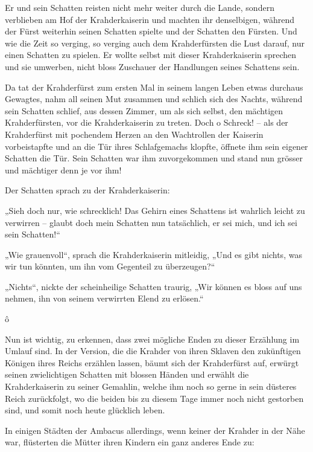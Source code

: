 \documentclass[10pt, a4paper, oneside]{book}
\newcommand{\trennzeichen}{%
        \begin{center}%
            \vspace*{-1em}
            \andorfont\Huge{ô}
        \end{center}
    }
\begin{document}
Er und sein Schatten reisten nicht mehr weiter durch die Lande, sondern verblieben am Hof der Krahderkaiserin und machten ihr denselbigen, während der Fürst weiterhin seinen Schatten spielte und der Schatten den Fürsten. Und wie die Zeit so verging, so verging auch dem Krahderfürsten die Lust darauf, nur einen Schatten zu spielen. Er wollte selbst mit dieser Krahderkaiserin sprechen und sie umwerben, nicht bloss Zuschauer der Handlungen seines Schattens sein.

Da tat der Krahderfürst zum ersten Mal in seinem langen Leben etwas durchaus Gewagtes, nahm all seinen Mut zusammen und schlich sich des Nachts, während sein Schatten schlief, aus dessen Zimmer, um als sich selbst, den mächtigen Krahderfürsten, vor die Krahderkaiserin zu treten. Doch o Schreck! – als der Krahderfürst mit pochendem Herzen an den Wachtrollen der Kaiserin vorbeistapfte und an die Tür ihres Schlafgemachs klopfte, öffnete ihm sein eigener Schatten die Tür. Sein Schatten war ihm zuvorgekommen und stand nun grösser und mächtiger denn je vor ihm!

Der Schatten sprach zu der Krahderkaiserin:

„Sieh doch nur, wie schrecklich! Das Gehirn eines Schattens ist wahrlich leicht zu verwirren – glaubt doch mein Schatten nun tatsächlich, er sei mich, und ich sei sein Schatten!“

„Wie grauenvoll“, sprach die Krahderkaiserin mitleidig, „Und es gibt nichts, was wir tun könnten, um ihn vom Gegenteil zu überzeugen?“

„Nichts“, nickte der scheinheilige Schatten traurig, „Wir können es bloss auf uns nehmen, ihn von seinem verwirrten Elend zu erlösen.“



\trennzeichen



Nun ist wichtig, zu erkennen, dass zwei mögliche Enden zu dieser Erzählung im Umlauf sind. In der Version, die die Krahder von ihren Sklaven den zukünftigen Königen ihres Reichs erzählen lassen, bäumt sich der Krahderfürst auf, erwürgt seinen zwielichtigen Schatten mit blossen Händen und erwählt die Krahderkaiserin zu seiner Gemahlin, welche ihm noch so gerne in sein düsteres Reich zurückfolgt, wo die beiden bis zu diesem Tage immer noch nicht gestorben sind, und somit noch heute glücklich leben.

In einigen Städten der Ambacus allerdings, wenn keiner der Krahder in der Nähe war, flüsterten die Mütter ihren Kindern ein ganz anderes Ende zu:
\end{document}
